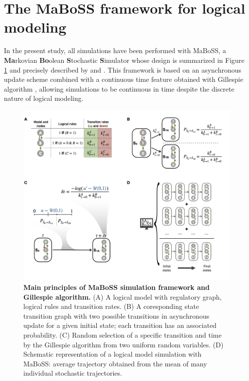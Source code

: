\documentclass[a4paper,12pt,twoside,onecolumn,openright,final,oldfontcommands]{memoir}
\begin{document}
\section{The MaBoSS framework for logical
modeling}\label{maboss-section}

In the present study, all simulations have been performed with MaBoSS, a
\textbf{Ma}rkovian \textbf{Bo}olean \textbf{S}tochastic
\textbf{S}imulator whose design is summarized in Figure \ref{fig:maboss}
and precisely described by \citet{stoll2012continuous} and
\citet{stoll2017maboss}. This framework is based on an asynchronous
update scheme combined with a continuous time feature obtained with
Gillespie algorithm \citep{gillespie1976general}, allowing simulations
to be continuous in time despite the discrete nature of logical
modeling.

\begin{figure}

{\centering \includegraphics[width=1\linewidth]{fig/maboss} 

}

\caption[Main principles of MaBoSS simulation framework and Gillespie algorithm]{\textbf{Main principles of MaBoSS simulation
framework and Gillespie algorithm.} (A) A logical model with regulatory
graph, logical rules and transition rates. (B) A coresponding state
transition graph with two possible transitions in asynchronous update
for a given initial state; each transition has an associated
probability. (C) Random selection of a specific transition and time by
the Gillespie algorithm from two uniform random variables. (D) Schematic
representation of a logical model simulation with MaBoSS: average
trajectory obtained from the mean of many individual stochastic
trajectories.}\label{fig:maboss}
\end{figure}
\end{document}
